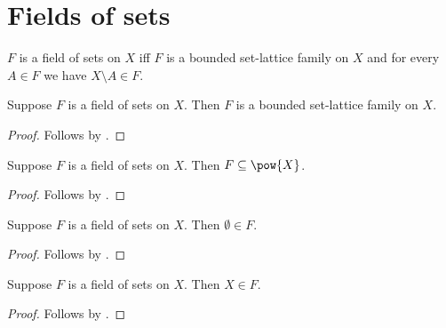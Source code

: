 \section{Fields of sets}





\begin{definition}\label{field_of_sets}
    $F$ is a field of sets on $X$ iff
        $F$ is a bounded set-lattice family on $X$ and
        for every $A\in F$ we have $X\setminus A\in F$.
\end{definition}

\begin{proposition}\label{field_of_sets_is_bounded_set_lattice_family}
    Suppose $F$ is a field of sets on $X$.
    Then $F$ is a bounded set-lattice family on $X$.
\end{proposition}
\begin{proof}
    Follows by .
\end{proof}

\begin{proposition}\label{field_of_sets_subseteq_powerset}
    Suppose $F$ is a field of sets on $X$.
    Then $F\subseteq\pow{X}$.
\end{proposition}
\begin{proof}
    Follows by
        .
\end{proof}

\begin{proposition}\label{field_of_sets_emptyset}
    Suppose $F$ is a field of sets on $X$.
    Then $\emptyset\in F$.
\end{proposition}
\begin{proof}
    Follows by
        .
\end{proof}

\begin{proposition}\label{field_of_sets_whole}
    Suppose $F$ is a field of sets on $X$.
    Then $X\in F$.
\end{proposition}
\begin{proof}
    Follows by
        .
\end{proof}

